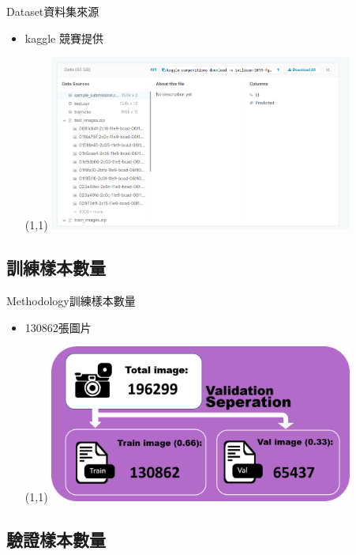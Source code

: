 \documentclass{beamer}
\begin{document}
\begin{CJK}{UTF8}{}
\begin{frame}{Dataset}{資料集來源}
\vspace{-4.5cm}
	\begin{itemize}
	\item{
		kaggle 競賽提供
		\begin{textblock}{3}(1,1)
		\includegraphics[width=10cm]{dataset.png}
		\end{textblock}
	}
	\end{itemize}
\end{frame}

\subsection{訓練樣本數量}

\begin{frame}{Methodology}{訓練樣本數量}
\vspace{-4.5cm}
	\begin{itemize}
	\item{
		130862張圖片
		\begin{textblock}{3}(1,1)
		\includegraphics[width=10cm]{data_split.png}
		\end{textblock}
	}
	\end{itemize}
\end{frame}

\subsection{驗證樣本數量}


\end{CJK}
\end{document}

